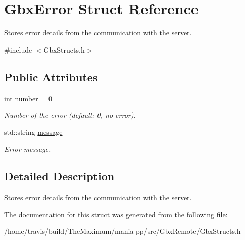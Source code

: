 \hypertarget{structGbxError}{\section{Gbx\-Error Struct Reference}
\label{structGbxError}
}


Stores error details from the communication with the server.  




{\ttfamily \#include $<$Gbx\-Structs.\-h$>$}

\subsection*{Public Attributes}
\begin{DoxyCompactItemize}
\item 
\hypertarget{structGbxError_ae5627cae63e837beaa75f798e47be50e}{int \hyperlink{structGbxError_ae5627cae63e837beaa75f798e47be50e}{number} = 0}\label{structGbxError_ae5627cae63e837beaa75f798e47be50e}

\begin{DoxyCompactList}\small\item\em Number of the error (default\-: 0, no error). \end{DoxyCompactList}\item 
\hypertarget{structGbxError_af52353692b5c160deac99c4285f01a5a}{std\-::string \hyperlink{structGbxError_af52353692b5c160deac99c4285f01a5a}{message}}\label{structGbxError_af52353692b5c160deac99c4285f01a5a}

\begin{DoxyCompactList}\small\item\em Error message. \end{DoxyCompactList}\end{DoxyCompactItemize}


\subsection{Detailed Description}
Stores error details from the communication with the server. 

The documentation for this struct was generated from the following file\-:\begin{DoxyCompactItemize}
\item 
/home/travis/build/\-The\-Maximum/mania-\/pp/src/\-Gbx\-Remote/Gbx\-Structs.\-h\end{DoxyCompactItemize}
